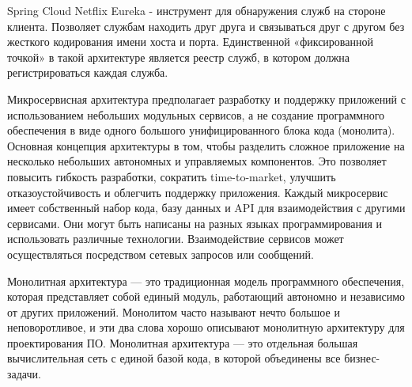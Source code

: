         Spring Cloud Netflix Eureka - инструмент для обнаружения служб на стороне клиента. Позволяет службам находить друг друга и связываться друг с другом без жесткого кодирования имени хоста и порта. Единственной «фиксированной точкой» в такой архитектуре является реестр служб, в котором должна регистрироваться каждая служба.

        Микросервисная архитектура предполагает разработку и поддержку приложений с использованием небольших модульных сервисов, а не создание программного обеспечения в виде одного большого унифицированного блока кода (монолита). Основная концепция архитектуры в том, чтобы разделить сложное приложение на несколько небольших автономных и управляемых компонентов. Это позволяет повысить гибкость разработки, сократить time-to-market, улучшить отказоустойчивость и облегчить поддержку приложения.
        Каждый микросервис имеет собственный набор кода, базу данных и API для взаимодействия с другими сервисами. Они могут быть написаны на разных языках программирования и использовать различные технологии. Взаимодействие сервисов может осуществляться посредством сетевых запросов или сообщений.

        Монолитная архитектура — это традиционная модель программного обеспечения, которая представляет собой единый модуль, работающий автономно и независимо от других приложений. Монолитом часто называют нечто большое и неповоротливое, и эти два слова хорошо описывают монолитную архитектуру для проектирования ПО. Монолитная архитектура — это отдельная большая вычислительная сеть с единой базой кода, в которой объединены все бизнес-задачи.

\clearpage